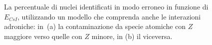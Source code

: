 \begin{figure}[!p] 
	\centering
	\hspace{10mm}
	\caption{La percentuale di nuclei identificati in modo erroneo in funzione di $E_{CsI}$, utilizzando un modello che comprenda anche le interazioni adroniche: in~(a) la contaminazione da specie atomiche con $Z$ maggiore verso quelle con $Z$ minore, in (b) il viceversa.} \label{fig:leakage_res_adron}
\end{figure}


\clearpage
\subsection{}

